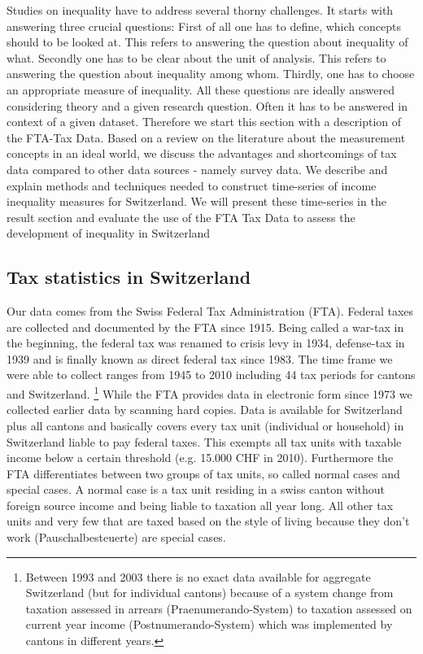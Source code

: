\documentclass[twoside]{article}\usepackage[]{graphicx}\usepackage[]{color}
\begin{document}
\begin{multicols}{2}
Studies on inequality have to address several thorny challenges. It starts with answering three crucial questions: First of all one has to define, which concepts should to be looked at. This refers to answering the question about inequality of what. Secondly one has to be clear about the unit of analysis. This refers to answering the question about inequality among whom. Thirdly, one has to choose an appropriate measure of inequality. All these questions are ideally answered considering theory and a given research question. Often it has to be answered in context of a given dataset. Therefore we start this section with a description of the FTA-Tax Data. Based on a review on the literature about the measurement concepts in an ideal world, we discuss the advantages and shortcomings of tax data compared to other data sources - namely survey data. We describe and explain methods and techniques needed to construct time-series of income inequality measures for Switzerland. We will present these time-series in the result section and evaluate the use of the FTA Tax Data to assess the development of inequality in Switzerland


\subsection{Tax statistics in Switzerland}

Our data comes from the Swiss Federal Tax Administration (FTA). Federal taxes are collected and documented by the FTA since 1915. Being called a war-tax in the beginning, the federal tax was renamed to crisis levy in 1934, defense-tax in 1939 and is finally known as direct federal tax since 1983. The time frame we were able to collect ranges from 1945 to 2010 including 44 tax periods for cantons and Switzerland. \footnote{Between 1993 and 2003 there is no exact data available for aggregate Switzerland (but for individual cantons) because of a system change from taxation assessed in arrears (Praenumerando-System) to taxation assessed on current year income (Postnumerando-System) which was implemented by cantons in different years.}  While the FTA provides data in electronic form since 1973 we collected earlier data by scanning hard copies. Data is available for Switzerland plus all cantons and basically covers every tax unit (individual or household) in Switzerland liable to pay federal taxes. This exempts all tax units with taxable income below a certain threshold (e.g. 15.000 CHF in 2010). Furthermore the FTA differentiates between two groups of tax units, so called normal cases and special cases. A normal case is a tax unit residing in a swiss canton without foreign source income and being liable to taxation all year long. All other tax units and very few that are taxed based on the style of living because they don't work (Pauschalbesteuerte) are special cases. \\


\end{multicols}
\end{document}
